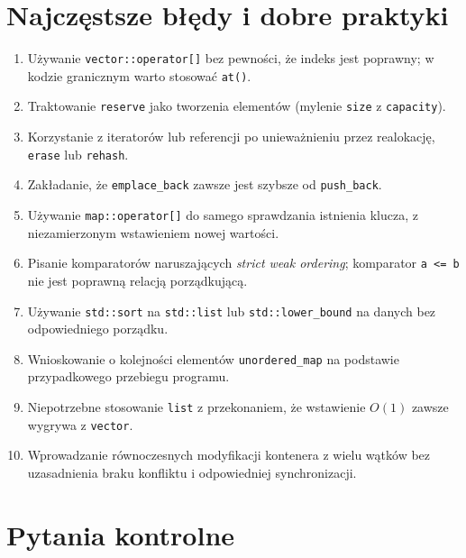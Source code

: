 \section{Najczęstsze błędy i dobre praktyki}
\label{sec:cpp13-pitfalls}

\begin{enumerate}
\item Używanie \texttt{vector::operator[]} bez pewności, że indeks jest
  poprawny; w kodzie granicznym warto stosować \texttt{at()}.
\item Traktowanie \texttt{reserve} jako tworzenia elementów (mylenie
  \texttt{size} z \texttt{capacity}).
\item Korzystanie z iteratorów lub referencji po unieważnieniu przez
  realokację, \texttt{erase} lub \texttt{rehash}.
\item Zakładanie, że \texttt{emplace\_back} zawsze jest szybsze od
  \texttt{push\_back}.
\item Używanie \texttt{map::operator[]} do samego sprawdzania istnienia
  klucza, z niezamierzonym wstawieniem nowej wartości.
\item Pisanie komparatorów naruszających \emph{strict weak ordering};
  komparator \texttt{a <= b} nie jest poprawną relacją porządkującą.
\item Używanie \texttt{std::sort} na \texttt{std::list} lub
  \texttt{std::lower\_bound} na danych bez odpowiedniego porządku.
\item Wnioskowanie o kolejności elementów \texttt{unordered\_map}
  na podstawie przypadkowego przebiegu programu.
\item Niepotrzebne stosowanie \texttt{list} z przekonaniem, że
  wstawienie $O(1)$ zawsze wygrywa z \texttt{vector}.
\item Wprowadzanie równoczesnych modyfikacji kontenera z wielu wątków
  bez uzasadnienia braku konfliktu i odpowiedniej synchronizacji.
\end{enumerate}

\section{Pytania kontrolne}


